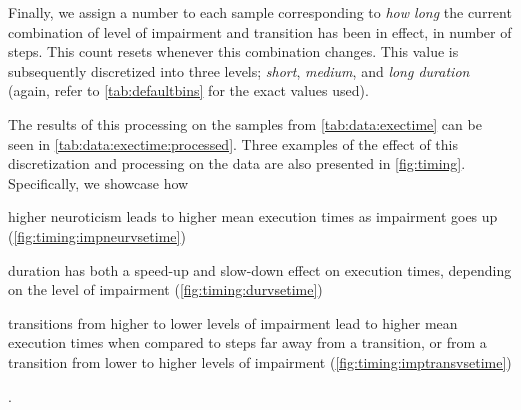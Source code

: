 Finally, we assign a number to each sample corresponding to \emph{how long} the current combination of level of impairment and transition has been in effect, in number of steps.
This count resets whenever this combination changes.
This value is subsequently discretized into three levels; \emph{short}, \emph{medium}, and \emph{long duration} (again, refer to \cref{tab:defaultbins} for the exact values used).

The results of this processing on the samples from \cref{tab:data:exectime} can be seen in \cref{tab:data:exectime:processed}.
Three examples of the effect of this discretization and processing on the data are also presented in \cref{fig:timing}.
Specifically, we showcase how
\begin{enumerate*}[itemjoin={{; }}, itemjoin*={{; and}}]
    \item higher neuroticism leads to higher mean execution times as impairment goes up (\cref{fig:timing:impneurvsetime})
    \item duration has both a speed-up and slow-down effect on execution times, depending on the level of impairment (\cref{fig:timing:durvsetime})
    \item transitions from higher to lower levels of impairment lead to higher mean execution times when compared to steps far away from a transition, or from a transition from lower to higher levels of impairment (\cref{fig:timing:imptransvsetime})
\end{enumerate*}.


